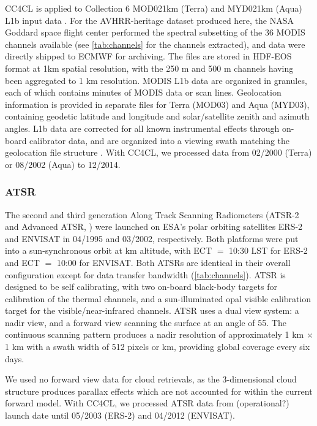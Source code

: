 CC4CL is applied to Collection 6 MOD021km (Terra) and MYD021km (Aqua) L1b input data \citep{MODIS_L1B}. For the AVHRR-heritage dataset produced here, the NASA Goddard space flight center performed the spectral subsetting of the 36 MODIS channels available (see \autoref{tab:channels} for the channels extracted), and data were directly shipped to ECMWF for archiving. The files are stored in HDF-EOS format at 1km spatial resolution, with the 250 m and 500 m channels having been aggregated to 1 km resolution. MODIS L1b data are organized in granules, each of which contains  minutes of MODIS data or  scan lines. Geolocation information is provided in separate files for Terra (MOD03) and Aqua (MYD03), containing geodetic latitude and longitude and solar/satellite zenith and azimuth angles. L1b data are corrected for all known instrumental effects through on-board calibrator data, and are organized into a viewing swath matching the geolocation file structure \citep{MODIS_PUG}. With CC4CL, we processed data from 02/2000 (Terra) or 08/2002 (Aqua) to 12/2014. 


\subsubsection{ATSR}

The second and third generation Along Track Scanning Radiometers (ATSR-2 and Advanced ATSR, \citet{Merchant12}) were launched on ESA's polar orbiting satellites ERS-2 and ENVISAT in 04/1995 and 03/2002, respectively. Both platforms were put into a sun-synchronous orbit at  km altitude, with ECT $=$ 10:30 LST for ERS-2 and ECT $=$ 10:00 for ENVISAT. Both ATSRs are identical in their overall configuration except for data transfer bandwidth (\autoref{tab:channels}). ATSR is designed to be self calibrating, with two on-board black-body targets for calibration of the thermal channels, and a sun-illuminated opal visible calibration target for the visible/near-infrared channels. ATSR uses a dual view system: a nadir view, and a forward view scanning the surface at an angle of 55\textdegree. The continuous scanning pattern produces a nadir resolution of approximately 1 km $\times$ 1 km with a swath width of 512 pixels or  km, providing global coverage every six days. 

We used no forward view data for cloud retrievals, as the 3-dimensional cloud structure produces parallax effects which are not accounted for within the current forward model. With CC4CL, we processed ATSR data from (operational?) launch date until 05/2003 (ERS-2) and 04/2012 (ENVISAT). 

